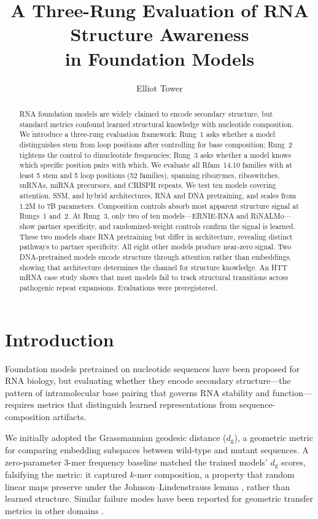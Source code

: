 \documentclass[11pt]{article}
\title{A Three-Rung Evaluation of RNA Structure Awareness\\
  in Foundation Models}
\author{Elliot Tower}
\affil{Independent researcher \\ \texttt{elliot@elliottower.ai}}
\newcommand{\dg}{d_{\mathrm{g}}}
\begin{document}
\maketitle

\begin{abstract}
RNA foundation models are widely claimed to encode secondary structure,
but standard metrics confound learned structural knowledge with
nucleotide composition.  We introduce a three-rung evaluation
framework: Rung~1 asks whether a model distinguishes stem from loop
positions after controlling for base composition; Rung~2 tightens the
control to dinucleotide frequencies; Rung~3 asks whether a model knows
which specific position pairs with which.  We evaluate all Rfam~14.10 families with at least 5 stem and 5
loop positions (52 families), spanning ribozymes, riboswitches,
snRNAs, miRNA precursors, and CRISPR repeats.  We test ten models covering attention, SSM, and
hybrid architectures, RNA and DNA pretraining, and scales from 1.2M
to 7B parameters.  Composition controls absorb most apparent structure
signal at Rungs~1 and~2.  At Rung~3, only two of ten
models---ERNIE-RNA and RiNALMo---show partner specificity, and
randomized-weight controls confirm the signal is learned.  These two
models share RNA pretraining but differ in architecture, revealing
distinct pathways to partner specificity.  All eight other models produce near-zero signal.  Two
DNA-pretrained models encode structure through attention rather
than embeddings, showing that architecture determines the
channel for structure knowledge.  An HTT mRNA case study shows that
most models fail to track structural transitions across pathogenic
repeat expansions.  Evaluations were preregistered.
\end{abstract}


\section{Introduction}
\label{sec:intro}

Foundation models pretrained on nucleotide sequences have been
proposed for RNA biology, but evaluating whether they encode secondary
structure---the pattern of intramolecular base pairing that governs
RNA stability and function---requires metrics that distinguish learned
representations from sequence-composition artifacts.

We initially adopted the Grassmannian geodesic distance ($\dg$), a
geometric metric for comparing embedding subspaces between wild-type
and mutant sequences.  A zero-parameter 3-mer frequency baseline
matched the trained models' $\dg$ scores, falsifying the metric: it
captured $k$-mer composition, a property that random linear maps
preserve under the Johnson--Lindenstrauss lemma
\citep{johnson1984extensions}, rather than learned structure.  Similar
failure modes have been reported for geometric transfer metrics in
other domains \citep{tower2026boundary}.
\end{document}
